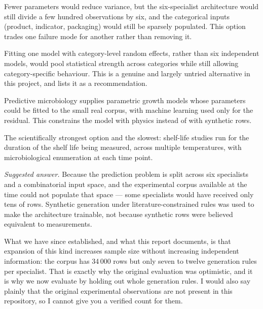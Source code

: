 \begin{description}[leftmargin=1.5em, style=nextline, font=\bfseries\color{dgreen}]
\item[Train simpler models on the real data only] Fewer parameters would
  reduce variance, but the six-specialist architecture would still divide
  a few hundred observations by six, and the categorical inputs
  (product, indicator, packaging) would still be sparsely populated. This
  option trades one failure mode for another rather than removing it.
\item[Hierarchical or multi-task modelling] Fitting one model with
  category-level random effects, rather than six independent models, would
  pool statistical strength across categories while still allowing
  category-specific behaviour. This is a genuine and largely untried
  alternative in this project, and  lists it as a
  recommendation.
\item[Transfer from a mechanistic baseline] Predictive microbiology
  supplies parametric growth models whose parameters could be fitted to the
  small real corpus, with machine learning used only for the residual.
  This constrains the model with physics instead of with synthetic rows.
\item[Collecting more experimental data] The scientifically strongest
  option and the slowest: shelf-life studies run for the duration of the
  shelf life being measured, across multiple temperatures, with
  microbiological enumeration at each time point.
\end{description}

\begin{questionbox}[title=Likely question --- ``Why did you use synthetic data at all?'']
\emph{Suggested answer.} Because the prediction problem is split across
six specialists and a combinatorial input space, and the experimental
corpus available at the time could not populate that space --- some
specialists would have received only tens of rows. Synthetic generation
under literature-constrained rules was used to make the architecture
trainable, not because synthetic rows were believed equivalent to
measurements.

What we have since established, and what this report documents, is that
expansion of this kind increases sample size without increasing
independent information: the corpus has 34\,000 rows but only seven to
twelve generation rules per specialist. That is exactly why the original
evaluation was optimistic, and it is why we now evaluate by holding out
whole generation rules. I would also say plainly that the original
experimental observations are not present in this repository, so I cannot
give you a verified count for them.
\end{questionbox}

